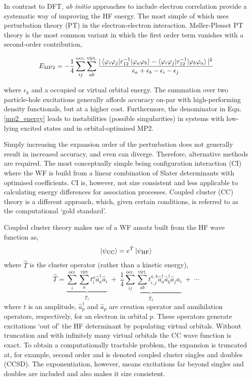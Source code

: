 \documentclass[main.tex]{subfiles}
\begin{document}
In contrast to DFT, \emph{ab initio} approaches to include electron correlation provide a systematic way of improving the HF energy. The most simple of which uses perturbation theory (PT) in the electron-electron interaction. M{\o}ller-Plesset PT theory is the most common variant in which the first order term vanishes with a second-order contribution,\cite{Cremer2011}

\begin{equation}
E_\text{MP2} = -\frac{1}{4} \sum_{ij}^\text{occ.}\sum_{ab}^\text{virt.}\frac{|\braket{\varphi_i \varphi_j |r_{12}^{-1}| \varphi_a \varphi_b} - \braket{\varphi_i \varphi_j |r_{12}^{-1}| \varphi_b \varphi_a}|^2}{\epsilon_a + \epsilon_b - \epsilon_i - \epsilon_j}
\label{mp2_energy}
\end{equation}

where $\epsilon_k$ and a occupied or virtual orbital energy. The summation over two particle-hole excitations generally affords accuracy on-par with high-performing density functionals,\cite{McKechnie2015, Smith2019} but at a higher cost. Furthermore, the denominator in Eqn. \eqref{mp2_energy} leads to instabilities (possible singularities) in systems with low-lying excited states and in orbital-optimised MP2.\cite{Lee2018}

Simply increasing the expansion order of the perturbation does not generally result in increased accuracy, and even can diverge.\cite{Forsberg2000} Therefore, alternative methods are required. The most conceptually simple being configuration interaction (CI) where the WF is build from a linear combination of Slater determinants with optimised coefficients. CI is, however, not size consistent and less applicable to calculating energy differences for association processes.\cite{Szalay2011} Coupled cluster (CC) theory is a different approach, which, given certain conditions, is referred to as the computational `gold standard'.\cite{ez2012} 

Coupled cluster theory makes use of a WF ansatz built from the HF wave function as,
\begin{equation}
\ket{\psi_\text{CC}} = {e}^{\hat{T}}\ket{\psi_\text{HF}}
\end{equation}
where $\hat{T}$ is the cluster operator (rather than a kinetic energy),
\begin{equation}
\hat{T} = \underbrace{\sum_i^\text{occ}\sum_a^\text{virt} t_i^a \hat{a}^\dagger_a\hat{a}_i }_{\hat{T}_1} \;+\; \underbrace{\frac{1}{4}\sum_{ij}^\text{occ.}\sum_{ab}^\text{virt.}t_{i, j}^{a, b} \hat{a}_a^\dagger\hat{a}_b^\dagger \hat{a}_j \hat{a}_i}_{\hat{T}_2} \;+ \;\cdots
\end{equation}
where $t$ is an amplitude, $\hat{a}^\dagger_p$ and $\hat{a}_p$ are creation operator and annihilation operators, respectively, for an electron in orbital $p$. These operators  generate excitations `out of' the HF determinant by populating virtual orbitals. Without truncation and with infinitely many virtual orbitals the CC wave function is exact. To obtain a computationally tractable problem, the expansion is truncated at, for example, second order and is denoted coupled cluster singles and doubles (CCSD). The exponentiation, however, means excitations far beyond singles and doubles are included and also makes it size consistent. 
\end{document}
